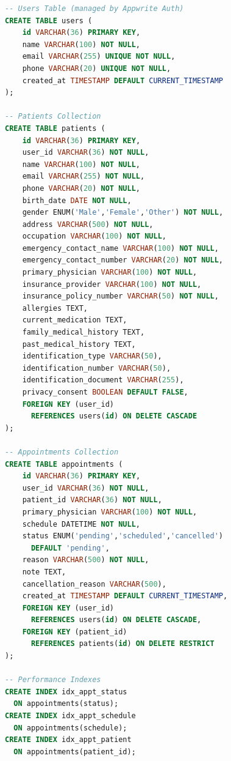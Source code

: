 \documentclass[11pt,a4paper]{article}
\begin{document}
\begin{lstlisting}[language=SQL, caption={Conceptual SQL Schema}]
-- Users Table (managed by Appwrite Auth)
CREATE TABLE users (
    id VARCHAR(36) PRIMARY KEY,
    name VARCHAR(100) NOT NULL,
    email VARCHAR(255) UNIQUE NOT NULL,
    phone VARCHAR(20) UNIQUE NOT NULL,
    created_at TIMESTAMP DEFAULT CURRENT_TIMESTAMP
);

-- Patients Collection
CREATE TABLE patients (
    id VARCHAR(36) PRIMARY KEY,
    user_id VARCHAR(36) NOT NULL,
    name VARCHAR(100) NOT NULL,
    email VARCHAR(255) NOT NULL,
    phone VARCHAR(20) NOT NULL,
    birth_date DATE NOT NULL,
    gender ENUM('Male','Female','Other') NOT NULL,
    address VARCHAR(500) NOT NULL,
    occupation VARCHAR(100) NOT NULL,
    emergency_contact_name VARCHAR(100) NOT NULL,
    emergency_contact_number VARCHAR(20) NOT NULL,
    primary_physician VARCHAR(100) NOT NULL,
    insurance_provider VARCHAR(100) NOT NULL,
    insurance_policy_number VARCHAR(50) NOT NULL,
    allergies TEXT,
    current_medication TEXT,
    family_medical_history TEXT,
    past_medical_history TEXT,
    identification_type VARCHAR(50),
    identification_number VARCHAR(50),
    identification_document VARCHAR(255),
    privacy_consent BOOLEAN DEFAULT FALSE,
    FOREIGN KEY (user_id)
      REFERENCES users(id) ON DELETE CASCADE
);

-- Appointments Collection
CREATE TABLE appointments (
    id VARCHAR(36) PRIMARY KEY,
    user_id VARCHAR(36) NOT NULL,
    patient_id VARCHAR(36) NOT NULL,
    primary_physician VARCHAR(100) NOT NULL,
    schedule DATETIME NOT NULL,
    status ENUM('pending','scheduled','cancelled')
      DEFAULT 'pending',
    reason VARCHAR(500) NOT NULL,
    note TEXT,
    cancellation_reason VARCHAR(500),
    created_at TIMESTAMP DEFAULT CURRENT_TIMESTAMP,
    FOREIGN KEY (user_id)
      REFERENCES users(id) ON DELETE CASCADE,
    FOREIGN KEY (patient_id)
      REFERENCES patients(id) ON DELETE RESTRICT
);

-- Performance Indexes
CREATE INDEX idx_appt_status
  ON appointments(status);
CREATE INDEX idx_appt_schedule
  ON appointments(schedule);
CREATE INDEX idx_appt_patient
  ON appointments(patient_id);
\end{lstlisting}
\end{document}
